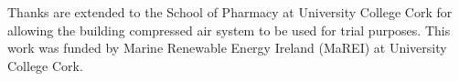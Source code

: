 \begin{acknowledgements}
Thanks are extended to the School of Pharmacy at University College Cork for allowing the building compressed air system to be used for trial purposes. This work was funded by Marine Renewable Energy Ireland (MaREI) at University College Cork.
\end{acknowledgements}

%
%



